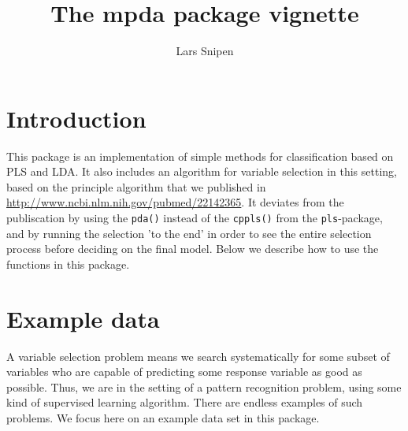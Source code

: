 \documentclass[a4paper]{article}\usepackage[]{graphicx}\usepackage[]{color}
\title{The mpda package vignette}
\author{Lars Snipen}
\date{}
\begin{document}

\maketitle


\section{Introduction}
This package is an implementation of simple methods for classification based on PLS and LDA. It also includes an algorithm for variable selection in this setting, based on the principle algorithm that we published in \url{http://www.ncbi.nlm.nih.gov/pubmed/22142365}. It deviates from the publiscation by using the \texttt{pda()} instead of the \texttt{cppls()} from the \texttt{pls}-package, and by running the selection 'to the end' in order to see the entire selection process before deciding on the final model. Below we describe how to use the functions in this package.



\section{Example data}
A variable selection problem means we search systematically for some subset of variables who are capable of predicting some response variable as good as possible. Thus, we are in the setting of a pattern recognition problem, using some kind of supervised learning algorithm. There are endless examples of such problems. We focus here on an example data set in this package.
\end{document}
